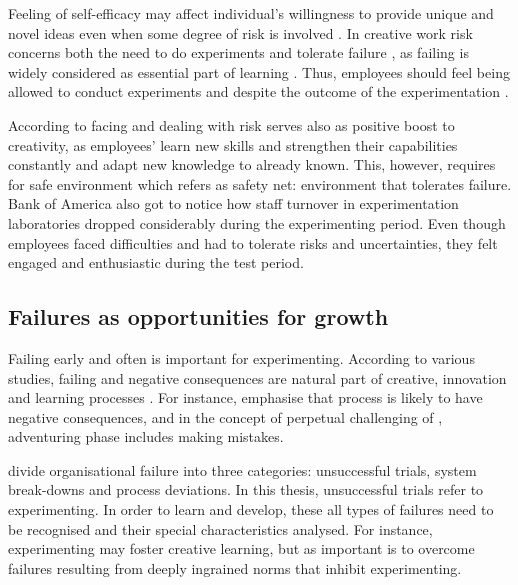 Feeling of self-efficacy may affect individual's willingness to provide unique and novel ideas even when some degree of risk is involved \citep{mumford1988creativity}. In creative work risk concerns both the need to do experiments and tolerate failure \citep{andriopoulos2000enhancing,quinn1985managing}, as failing is widely considered as essential part of learning \citep{farson2002failuretolerantleader}. Thus, employees should feel being allowed to conduct experiments and despite the outcome of the experimentation \citep{jung2003role}.

According to \citet{andriopoulos2000enhancing} facing and dealing with risk serves also as positive boost to creativity, as employees' learn new skills and strengthen their capabilities constantly and adapt new knowledge to already known. This, however, requires for safe environment which \citet{andriopoulos2000enhancing} refers as safety net: environment that tolerates failure. Bank of America also got to notice how staff turnover in experimentation laboratories dropped considerably during the experimenting period. Even though employees faced difficulties and had to tolerate risks and uncertainties, they felt engaged and enthusiastic during the test period.  \citep{thomke2003r}

\subsection{Failures as opportunities for growth}
Failing early and often is important for experimenting. According to various studies, failing and negative consequences are natural part of creative, innovation and learning processes \citep{hennessey19881,shalley2004leaders,andriopoulos2000enhancing}. For instance, \citet{hennessey19881} emphasise that process is likely to have negative consequences, and in the concept of perpetual challenging of \citet{andriopoulos2000enhancing}, adventuring phase includes making mistakes. 

\citet{garvin2008yours} divide organisational failure into three categories: unsuccessful trials, system break-downs and process deviations. In this thesis, unsuccessful trials refer to experimenting. In order to learn and develop, these all types of failures need to be recognised and their special characteristics analysed. For instance, experimenting may foster creative learning, but as important is to overcome failures resulting from deeply ingrained norms that inhibit experimenting. \citep{garvin2008yours}

